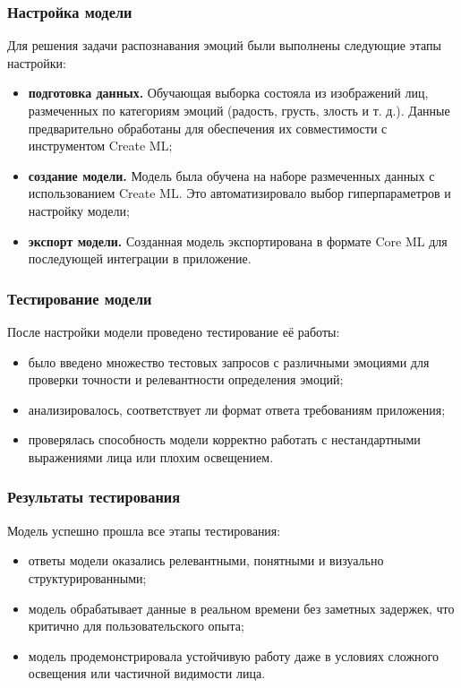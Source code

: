 {{\subsubsection*{Настройка модели}
Для решения задачи распознавания эмоций были выполнены следующие этапы настройки:
\begin{itemize}
    \item \textbf{подготовка данных.} Обучающая выборка состояла из изображений лиц, размеченных по категориям эмоций (радость, грусть, злость и т. д.). Данные предварительно обработаны для обеспечения их совместимости с инструментом Create ML;
    \item \textbf{создание модели.} Модель была обучена на наборе размеченных данных с использованием Create ML. Это автоматизировало выбор гиперпараметров и настройку модели;
    \item \textbf{экспорт модели.} Созданная модель экспортирована в формате Core ML для последующей интеграции в приложение.
\end{itemize}

\subsubsection*{Тестирование модели}
После настройки модели проведено тестирование её работы:
\begin{itemize}
    \item было введено множество тестовых запросов с различными эмоциями для проверки точности и релевантности определения эмоций;
    \item анализировалось, соответствует ли формат ответа требованиям приложения;
    \item проверялась способность модели корректно работать с нестандартными выражениями лица или плохим освещением.
\end{itemize}

\subsubsection*{Результаты тестирования}
Модель успешно прошла все этапы тестирования:
\begin{itemize}
    \item ответы модели оказались релевантными, понятными и визуально структурированными;
    \item модель обрабатывает данные в реальном времени без заметных задержек, что критично для пользовательского опыта;
    \item модель продемонстрировала устойчивую работу даже в условиях сложного освещения или частичной видимости лица.
\end{itemize}

}}
